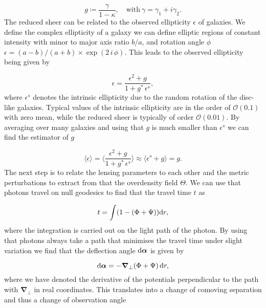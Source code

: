 \documentclass[../main.tex]{subfiles}
\begin{document}
\begin{equation}
    g \coloneqq \frac{\gamma}{1-\kappa},\quad \text{with}\: \gamma = \gamma_1 + i \gamma_2.
\end{equation} 
The reduced sheer can be related to the observed ellipticity $\epsilon$ of galaxies. We define the complex ellipticity of a galaxy we can define elliptic regions of constant intensity with minor to major axis ratio $b/a$, and rotation angle $\phi$ $\epsilon=(a-b)/(a+b)\times \exp(2\,i\,\phi)$. This leads to the observed ellipticity being given by 

\begin{equation}
    \epsilon = \frac{\epsilon^2+g}{1+g^*\,\epsilon^s},
\end{equation}
where $\epsilon^s$ denotes the intrinsic ellipticity due to the random rotation of the disc-like galaxies. Typical values of the intrinsic ellipticity are in the order of $\mathcal{O}(0.1)$ with zero mean, while the reduced sheer is typically of order $\mathcal{O}(0.01)$. By averaging over many galaxies and using that $g$ is much smaller than $\epsilon^s$ we can find the estimator of $g$ 

\begin{equation}
    \label{eq:lesning_estimator}
    \langle \epsilon \rangle=\langle \frac{\epsilon^2+g}{1+g^*\,\epsilon^s} \rangle \approx \langle \epsilon^s+g\rangle = g.
\end{equation}
The next step is to relate the lensing parameters to each other and the metric perturbations to extract from that the overdensity field $\varTheta$.  
We can use that photons travel on null geodesics to find that the travel time $t$ as

\begin{equation*}
    t = \int (1-(\Phi+\Psi)) \mathrm{d} r,
\end{equation*}
where the integration is carried out on the light path of the photon. By using that photons always take a path that minimises the travel time under slight variation we find that the deflection angle $\mathrm{d} \boldsymbol{\alpha}$ is given by 

\begin{equation}
    \label{eq:deflectionangle}
    \mathrm{d} \boldsymbol{\alpha} = - \boldsymbol{\nabla}_\perp (\Phi+\Psi)\, \mathrm{d} r,
\end{equation}  
where we have denoted the derivative of the potentials perpendicular to the path with $\boldsymbol{\nabla}_\perp$ in real coordinates. This translates into a change of comoving separation and thus a change of observation angle 
\end{document}
